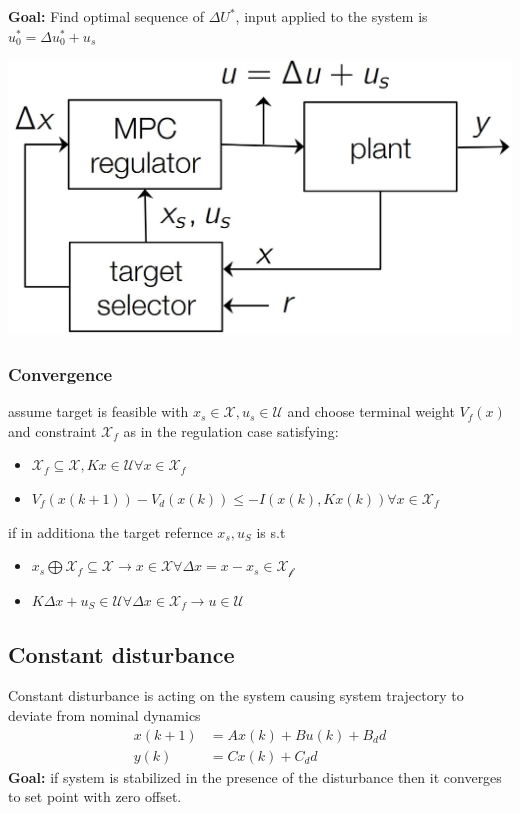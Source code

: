\textbf{Goal:} Find optimal sequence of $\Delta U^*$, input applied to the system is $u_0^* = \Delta u_0^*+u_s$
\begin{center}
\includegraphics[width = 0.6\linewidth]{MPC_summary/Images/Screenshot 2021-07-31 220518.jpg}
\end{center}
\subsubsection{Convergence}
assume target is feasible with $x_s\in \mathcal{X}, u_s \in \mathcal{U}$ and choose terminal weight $V_f(x)$ and constraint $\mathcal{X}_f$ as in the regulation case satisfying:
\begin{itemize}
    \item $\mathcal{X}_f \subseteq \mathcal{X}, Kx \in \mathcal{U} \forall x \in \mathcal{X}_f$
    \item $V_f(x(k+1)) - V_d(x(k)) \leq -I(x(k),Kx(k)) \forall x \in \mathcal{X}_f$
\end{itemize}
if in additiona the target refernce $x_s, u_S$ is s.t 
\begin{itemize}
    \item $x_s \bigoplus \mathcal{X}_f \subseteq \mathcal{X} \rightarrow x \in \mathcal{X} \forall \Delta x = x -x_s \in \mathcal{X_f}$
    \item $K \Delta x + u_S \in \mathcal{U} \forall \Delta x \in \mathcal{X}_f \rightarrow u \in \mathcal{U}$
\end{itemize}
\subsection{Constant disturbance}
Constant disturbance is acting on the system causing system trajectory to deviate from nominal dynamics
\begin{align*}
    x(k+1) &= Ax(k) + Bu(k) + B_dd\\
    y(k) &=Cx(k) + C_dd
\end{align*}
\textbf{Goal:} if system is stabilized in the presence of the disturbance then it converges to set point with zero offset.
